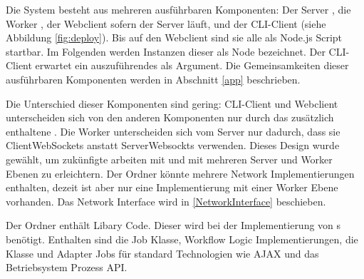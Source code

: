 \noindent Die System besteht aus mehreren ausführbaren Komponenten:
Der Server , die Worker , der Webclient  sofern der Server läuft, und der CLI-Client  (siehe Abbildung \ref{fig:deploy}).
Bis auf den Webclient sind sie alle als Node.js Script startbar.
Im Folgenden werden Instanzen dieser als Node bezeichnet.
Der CLI-Client erwartet ein auszuführendes \jobScript{} als Argument.
Die Gemeinsamkeiten dieser ausführbaren Komponenten werden in Abschnitt \ref{app} beschrieben.

Die Unterschied dieser Komponenten sind gering:
CLI-Client und Webclient unterscheiden sich von den anderen Komponenten nur durch das zusätzlich enthaltene \UI{}.
Die Worker unterscheiden sich vom Server nur dadurch, dass sie ClientWebSockets anstatt ServerWebsockts verwenden.
Dieses Design wurde gewählt, um zukünfigte arbeiten mit \ptp{} und \hcsno{} mit mehreren Server und Worker Ebenen zu erleichtern.
Der  Ordner könnte mehrere Network Implementierungen enthalten, dezeit ist aber nur eine \hcsno{} Implementierung mit einer Worker Ebene vorhanden.
Das Network Interface wird in \ref{NetworkInterface} beschieben.

Der  Ordner enthält Libary Code.
Dieser wird bei der Implementierung von \jobScript s benötigt.
Enthalten sind die Job Klasse, Workflow Logic Implementierungen, die \remoteJob{} Klasse und Adapter Jobs \cite{Gamma05a} für standard Technologien wie AJAX und das Betriebsystem Prozess API.


















\clearpage
